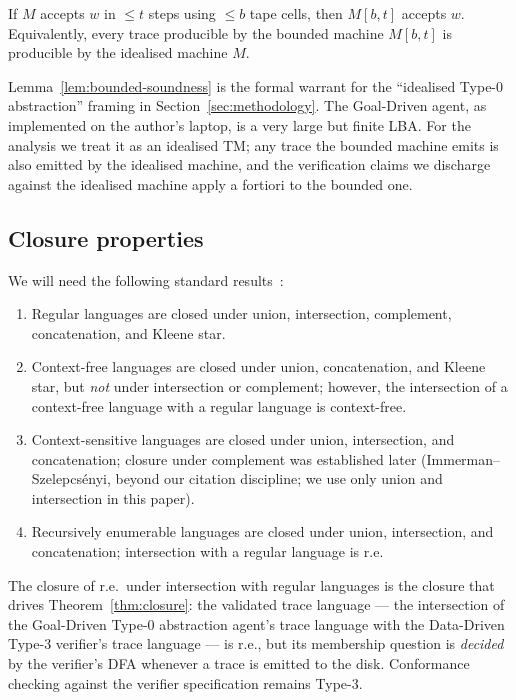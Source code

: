 \begin{lemma}
\label{lem:bounded-soundness}
If $M$ accepts $w$ in $\le t$ steps using $\le b$ tape cells, then
$M[b,t]$ accepts $w$.  Equivalently, every trace producible by
the bounded machine $M[b,t]$ is producible by the idealised
machine $M$.
\end{lemma}

Lemma~\ref{lem:bounded-soundness} is the formal warrant for the
``idealised Type-0 abstraction'' framing in
Section~\ref{sec:methodology}.  The Goal-Driven agent, as
implemented on the author's laptop, is a very large but finite
LBA.  For the analysis we treat it as an idealised TM; any trace
the bounded machine emits is also emitted by the idealised
machine, and the verification claims we discharge against the
idealised machine apply a fortiori to the bounded one.

\subsection{Closure properties}

We will need the following standard
results~\cite{hopcroft2006automata}:
\begin{enumerate}
\item Regular languages are closed under union, intersection,
complement, concatenation, and Kleene star.
\item Context-free languages are closed under union, concatenation,
and Kleene star, but \emph{not} under intersection or complement;
however, the intersection of a context-free language with a
regular language is context-free.
\item Context-sensitive languages are closed under union,
intersection, and concatenation; closure under complement was
established later (Immerman--Szelepcs\'enyi, beyond our citation
discipline; we use only union and intersection in this paper).
\item Recursively enumerable languages are closed under union,
intersection, and concatenation; intersection with a regular
language is r.e.
\end{enumerate}

The closure of r.e.\ under intersection with regular languages is
the closure that drives Theorem~\ref{thm:closure}: the validated
trace language --- the intersection of the Goal-Driven Type-0 abstraction
agent's trace language with the Data-Driven Type-3 verifier's
trace language --- is r.e., but its membership question is
\emph{decided} by the verifier's DFA whenever a trace is emitted
to the disk.  Conformance checking against the verifier specification remains Type-3.
